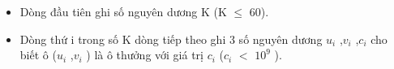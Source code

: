 \begin{itemize}
	\item Dòng đầu tiên ghi số nguyên dương K (K  $\le$  60).
	\item Dòng thứ i trong số K dòng tiếp theo ghi 3 số nguyên dương $u_{i}$ ,$v_{i}$ ,$c_{i}$ cho biết ô ($u_{i}$ ,$v_{i}$ ) là ô thưởng với giá trị $c_{i}$ ($c_{i}$ $<$ $10^{9}$ ).
\end{itemize}